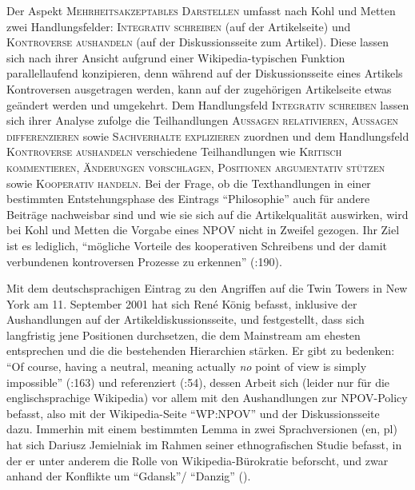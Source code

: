 \documentclass[fontsize=12pt]{scrartcl}
\begin{document}
Der Aspekt \textsc{Mehrheitsakzeptables Dar\-stel\-len} umfasst nach Kohl und Metten zwei Handlungsfelder: \textsc{Integrativ schrei\-ben} (auf der Artikelseite) und \textsc{Kontroverse aus\-handeln} (auf der Dis\-kus\-si\-onsseite zum Artikel). Diese lassen sich nach ihrer Ansicht aufgrund einer Wi\-ki\-pe\-dia-ty\-pischen Funktion parallellaufend konzipieren, denn w\"ahrend auf der Dis\-kus\-si\-onsseite eines Artikels Kontroversen ausgetragen werden, kann auf der zugeh\"origen Artikelseite etwas ge\"andert werden und umgekehrt. Dem Handlungsfeld \textsc{Integrativ schrei\-ben} lassen sich ihrer Ana\-lyse zufolge die Teilhandlungen \textsc{Aus\-sa\-gen re\-la\-ti\-vie\-ren}, \textsc{Aus\-sa\-gen dif\-fe\-ren\-zie\-ren} sowie \textsc{Sach\-ver\-hal\-te ex\-pli\-zie\-ren} zuordnen und dem Handlungsfeld \textsc{Kon\-tro\-ver\-se aus\-handeln} verschiedene Teilhandlungen wie \textsc{Kri\-tisch kom\-men\-tie\-ren}, \textsc{\"An\-de\-run\-gen vor\-schla\-gen}, \textsc{Po\-si\-ti\-o\-nen ar\-gu\-men\-ta\-tiv st\"ut\-zen} sowie \textsc{Ko\-ope\-ra\-tiv handeln}. Bei der Frage, ob die Texthandlungen in einer bestimmten Ent\-ste\-hungs\-phase des Eintrags "`Philosophie"' auch f\"ur andere Beitr\"age nachweisbar sind und wie sie sich auf die Artikelqualit\"at auswirken, wird bei Kohl und Metten die Vorgabe eines NPOV nicht in Zweifel gezogen. Ihr Ziel ist es lediglich, "`m\"ogliche Vorteile des kooperativen Schrei\-bens und der damit verbundenen kontroversen Prozesse zu erkennen"' (\cite{KohlMetten2006}:190). 

Mit dem deutschspra\-chi\-gen Eintrag zu den Angriffen auf die Twin Towers in New York am 11. September 2001 hat sich Ren\'{e} K\"onig befasst, inklusive der Aushandlungen auf der Artikeldis\-kus\-si\-onsseite, und festgestellt, dass sich langfristig jene Positionen durchsetzen, die dem Mainstream am ehesten entsprechen und die die bestehenden Hierarchien st\"arken. Er gibt zu bedenken: "`Of course, having a neutral, meaning actually \textit{no} point of view is simply impossible"' (\cite{Konig2013}:163) und referenziert (\cite{Reagle2012}:54), dessen Arbeit sich (leider nur f\"ur die eng\-lischspra\-chi\-ge Wi\-ki\-pe\-dia) vor allem mit den Aushandlungen zur NPOV-Policy befasst, also mit der Wi\-ki\-pe\-di\-a-Seite "`WP:NPOV"' und der Dis\-kus\-si\-onsseite dazu. Immerhin mit einem bestimmten Lemma in zwei Sprachversionen (en, pl) hat sich Dariusz Jemielniak im Rahmen seiner ethnografischen Studie befasst, in der er unter anderem die Rolle von Wi\-ki\-pe\-dia-B\"urokratie beforscht, und zwar anhand der Konflikte um "`Gdansk"'/ "`Danzig"' (\cite{Jemielniak2014}).
\end{document}
